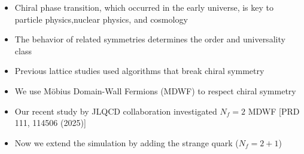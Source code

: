 \documentclass[10pt, aspectratio=169]{beamer} %
\begin{document}
\begin{frame}
\fontsize{11pt}{17pt}\selectfont
\vfill
\begin{itemize}
\setlength{\itemsep}{0.8em}
\item Chiral phase transition, which occurred in the early universe, is key to particle physics,nuclear physics, and cosmology
\item The behavior of related symmetries determines the order and universality class
\item Previous lattice studies used algorithms that break chiral symmetry
\end{itemize}
\vfill
\end{frame}
\begin{frame}
\vfill
{}
\fontsize{11pt}{14pt}\selectfont
\begin{itemize}
\item We use Möbius Domain-Wall Fermions (MDWF) to respect chiral symmetry
\item Our recent study by JLQCD collaboration investigated $N_f=2$ MDWF [PRD 111, 114506 (2025)]
\item Now we extend the simulation by adding the strange quark ($N_f=2+1$)
\end{itemize}
\vfill
\end{frame}
\end{document}
